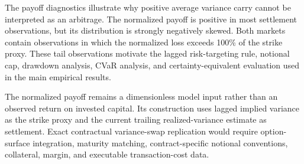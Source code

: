 The payoff diagnostics illustrate why positive average variance carry cannot be interpreted as an arbitrage. The normalized payoff is positive in most settlement observations, but its distribution is strongly negatively skewed. Both markets contain observations in which the normalized loss exceeds 100\% of the strike proxy. These tail observations motivate the lagged risk-targeting rule, notional cap, drawdown analysis, CVaR analysis, and certainty-equivalent evaluation used in the main empirical results.

The normalized payoff remains a dimensionless model input rather than an observed return on invested capital. Its construction uses lagged implied variance as the strike proxy and the current trailing realized-variance estimate as settlement. Exact contractual variance-swap replication would require option-surface integration, maturity matching, contract-specific notional conventions, collateral, margin, and executable transaction-cost data.
